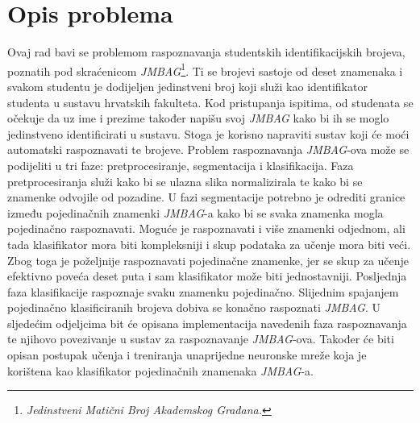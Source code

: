 \chapter{Opis problema}
\label{ch:opis-problema}
Ovaj rad bavi se problemom raspoznavanja studentskih identifikacijskih brojeva, poznatih pod skraćenicom
\emph{JMBAG}\footnote{\emph{Jedinstveni Matični Broj Akademskog Građana.}}. Ti se brojevi sastoje od deset znamenaka i
svakom studentu je dodijeljen jedinstveni broj koji služi kao identifikator studenta u sustavu hrvatskih fakulteta.
Kod pristupanja ispitima, od studenata se očekuje da uz ime i prezime također napišu svoj \emph{JMBAG} kako bi ih se
moglo jedinstveno identificirati u sustavu. Stoga je korisno napraviti sustav koji će moći automatski raspoznavati te
brojeve. Problem raspoznavanja \emph{JMBAG}-ova može se podijeliti u tri faze: pretprocesiranje, segmentacija i
klasifikacija. Faza pretprocesiranja služi kako bi se ulazna slika normalizirala te kako bi se znamenke odvojile od
pozadine. U fazi segmentacije potrebno je odrediti granice između pojedinačnih znamenki \emph{JMBAG}-a kako bi se svaka
znamenka mogla pojedinačno raspoznavati. Moguće je raspoznavati i više znamenki odjednom, ali tada klasifikator mora
biti kompleksniji i skup podataka za učenje mora biti veći. Zbog toga je poželjnije raspoznavati pojedinačne znamenke,
jer se skup za učenje efektivno poveća deset puta i sam klasifikator može biti jednostavniji. Posljednja faza
klasifikacije raspoznaje svaku znamenku pojedinačno. Slijednim spajanjem pojedinačno klasificiranih brojeva dobiva se
konačno raspoznati \emph{JMBAG}. U sljedećim odjeljcima bit će opisana implementacija navedenih faza raspoznavanja te
njihovo povezivanje u sustav za raspoznavanje \emph{JMBAG}-ova. Također će biti opisan postupak učenja i treniranja
unaprijedne neuronske mreže koja je korištena kao klasifikator pojedinačnih znamenaka \emph{JMBAG}-a.


